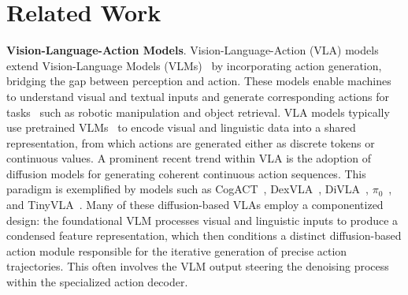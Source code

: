
\section{Related Work}
\label{sec:related}

\noindent \textbf{Vision-Language-Action Models}.
Vision-Language-Action (VLA) models~\citep{kim24openvla,li2023vision,DeeR-VLA,zitkovich2023rt} extend Vision-Language Models (VLMs)~\citep{alayrac2022flamingovisuallanguagemodel,karamcheti2024prismaticvlmsinvestigatingdesign,li2022blipbootstrappinglanguageimagepretraining, liu2023visualinstructiontuning,radford2021learning} by incorporating action generation, bridging the gap between perception and action. These models enable machines to understand visual and textual inputs and generate corresponding actions for tasks~\citep{awadalla2023openflamingoopensourceframeworktraining,li2023vision} such as robotic manipulation and object retrieval. VLA models typically use pretrained VLMs~\citep{karamcheti2024prismaticvlmsinvestigatingdesign} to encode visual and linguistic data into a shared representation, from which actions are generated either as discrete tokens or continuous values. A prominent recent trend within VLA is the adoption of diffusion models for generating coherent continuous action sequences. This paradigm is exemplified by models such as CogACT~\citep{li2024CogACT}, DexVLA~\citep{wen2025dexvla}, DiVLA~\citep{wen2024diffusion}, $\pi_0$~\citep{black2024pi_0}, and TinyVLA~\citep{wen2024tinyvla}. Many of these diffusion-based VLAs employ a componentized design: the foundational VLM processes visual and linguistic inputs to produce a condensed feature representation, which then conditions a distinct diffusion-based action module responsible for the iterative generation of precise action trajectories. This often involves the VLM output steering the denoising process within the specialized action decoder. 



